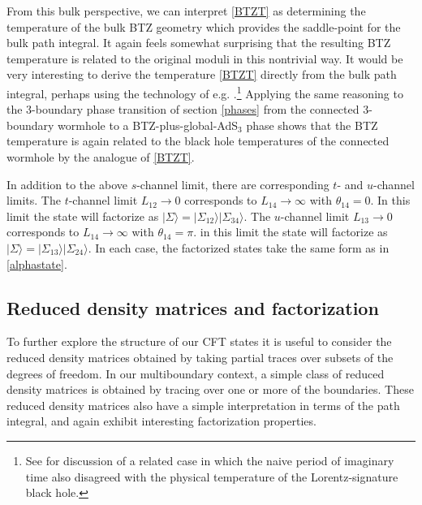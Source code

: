 \documentclass[12pt]{article}
\numberwithin{equation}{section}
\begin{document}
From this bulk perspective, we can interpret \eqref{BTZT} as determining the temperature of the bulk BTZ geometry which provides the saddle-point for the bulk path integral. It again feels somewhat surprising that the resulting BTZ temperature is related to the original moduli in this nontrivial way.
It would be very interesting to derive the temperature \eqref{BTZT} directly from the bulk path integral, perhaps using the technology of e.g. \cite{Faulkner:2013yia,Hartman:2013mia}.\footnote{See \cite{Louko:1998dj} for discussion of a related case in which the naive period of imaginary time also disagreed with the physical temperature of the Lorentz-signature black hole.}
Applying the same reasoning to the 3-boundary phase transition of section \ref{phases} from the connected 3-boundary wormhole to a BTZ-plus-global-AdS${}_3$ phase shows that the BTZ temperature is again related to the black hole temperatures of the connected wormhole by the analogue of \eqref{BTZT}.


In addition to the above $s$-channel limit, there are corresponding $t$- and $u$-channel limits. The $t$-channel limit $L_{12} \to 0$ corresponds to $L_{14} \to \infty$ with $\theta_{14}=0$. In this limit the state will factorize as $|\Sigma \rangle = |\Sigma_{12}\rangle |\Sigma_{34} \rangle$. The $u$-channel limit $L_{13} \to 0$ corresponds to $L_{14} \to \infty$ with $\theta_{14} = \pi$. in this limit the state will factorize as $|\Sigma \rangle = |\Sigma_{13}\rangle |\Sigma_{24} \rangle$. In each case, the factorized states take the same form as in \eqref{alphastate}.

%
\subsection{Reduced density matrices and factorization}
%
\label{reduced}

To further explore the structure of our CFT states it is useful to consider the reduced density matrices obtained by taking partial traces over subsets of the degrees of freedom. In our multiboundary context, a simple class of reduced density matrices is obtained by tracing over one or more of the boundaries. These reduced density matrices also have a simple interpretation in terms of the path integral, and again exhibit interesting factorization properties.
\end{document}
